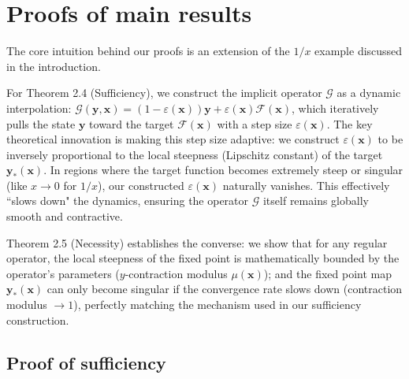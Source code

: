 \documentclass{amsart} %
\def\vx{{\bm{x}}}
\def\vy{{\bm{y}}}
\theoremstyle{definition}
\theoremstyle{remark}
\begin{document}



\appendix



\section{Proofs of main results}
\label{sec:app-main}

The core intuition behind our proofs is an extension of the $1/x$ example discussed in the introduction. 

For Theorem 2.4 (Sufficiency), we construct the implicit operator $\mathcal{G}$ as a dynamic interpolation: $\mathcal{G}(\vy,\vx) = (1-\varepsilon(\vx))\vy + \varepsilon(\vx)\mathcal{F}(\vx)$, which iteratively pulls the state $\vy$ toward the target $\mathcal{F}(\vx)$ with a step size $\varepsilon(\vx)$. The key theoretical innovation is making this step size adaptive: we construct $\varepsilon(\vx)$ to be inversely proportional to the local steepness (Lipschitz constant) of the target $\vy_\ast(\vx)$. In regions where the target function becomes extremely steep or singular (like $x \to 0$ for $1/x$), our constructed $\varepsilon(\vx)$ naturally vanishes. This effectively ``slows down" the dynamics, ensuring the operator $\mathcal{G}$ itself remains globally smooth and contractive. 

Theorem 2.5 (Necessity) establishes the converse: we show that for any regular operator, the local steepness of the fixed point is mathematically bounded by the operator's parameters ($y$-contraction modulus $\mu(\vx)$); and the fixed point map $\vy_\ast(\vx)$ can only become singular if the convergence rate slows down (contraction modulus $\to 1$), perfectly matching the mechanism used in our sufficiency construction.

\subsection{Proof of sufficiency}
\end{document}
